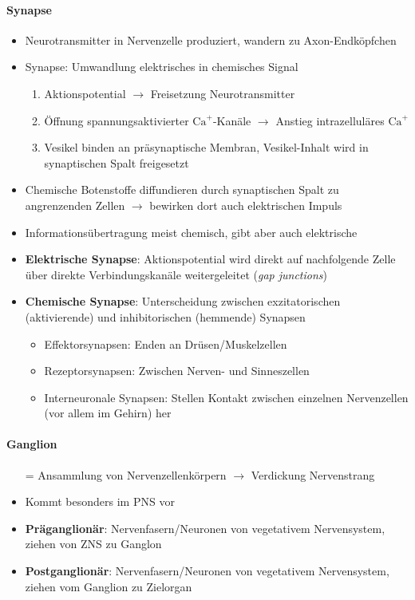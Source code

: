 \paragraph{Synapse}
\begin{itemize}
  \item Neurotransmitter in Nervenzelle produziert, wandern zu Axon-Endköpfchen
  \item Synapse: Umwandlung elektrisches in chemisches Signal
  \begin{enumerate}
    \item Aktionspotential \( \to \) Freisetzung Neurotransmitter
    \item Öffnung spannungsaktivierter \( \text{Ca}^+ \)-Kanäle \( \to \) Anstieg intrazelluläres \( \text{Ca}^+ \)
    \item Vesikel binden an präsynaptische Membran, Vesikel-Inhalt wird in synaptischen Spalt freigesetzt
  \end{enumerate}
  \item Chemische Botenstoffe diffundieren durch synaptischen Spalt zu angrenzenden Zellen \( \to \) bewirken dort auch elektrischen Impuls
  \item Informationsübertragung meist chemisch, gibt aber auch elektrische
  \item \textbf{Elektrische Synapse}: Aktionspotential wird direkt auf nachfolgende Zelle über direkte Verbindungskanäle weitergeleitet (\emph{gap junctions})
  \item \textbf{Chemische Synapse}: Unterscheidung zwischen exzitatorischen (aktivierende) und inhibitorischen (hemmende) Synapsen
  \begin{itemize}
    \item Effektorsynapsen: Enden an Drüsen/Muskelzellen
    \item Rezeptorsynapsen: Zwischen Nerven- und Sinneszellen
    \item Interneuronale Synapsen: Stellen Kontakt zwischen einzelnen Nervenzellen (vor allem im Gehirn) her
  \end{itemize}
\end{itemize}

\paragraph{Ganglion}
\begin{itemize}
  \item[=] Ansammlung von Nervenzellenkörpern \( \to \) Verdickung Nervenstrang
  \item Kommt besonders im PNS vor
  \item \textbf{Präganglionär}: Nervenfasern/Neuronen von vegetativem Nervensystem, ziehen von ZNS zu Ganglon
  \item \textbf{Postganglionär}: Nervenfasern/Neuronen von vegetativem Nervensystem, ziehen vom Ganglion zu Zielorgan 
\end{itemize}

